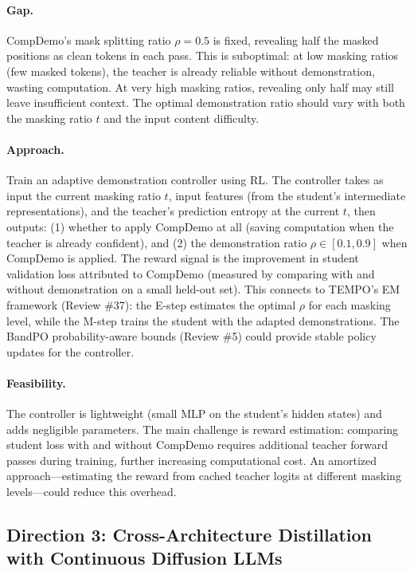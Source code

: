 \documentclass[11pt]{article}
\begin{document}
\paragraph{Gap.}
CompDemo's mask splitting ratio $\rho = 0.5$ is fixed, revealing half the masked positions as clean tokens in each pass. This is suboptimal: at low masking ratios (few masked tokens), the teacher is already reliable without demonstration, wasting computation. At very high masking ratios, revealing only half may still leave insufficient context. The optimal demonstration ratio should vary with both the masking ratio $t$ and the input content difficulty.

\paragraph{Approach.}
Train an adaptive demonstration controller using RL. The controller takes as input the current masking ratio $t$, input features (from the student's intermediate representations), and the teacher's prediction entropy at the current $t$, then outputs: (1) whether to apply CompDemo at all (saving computation when the teacher is already confident), and (2) the demonstration ratio $\rho \in [0.1, 0.9]$ when CompDemo is applied. The reward signal is the improvement in student validation loss attributed to CompDemo (measured by comparing with and without demonstration on a small held-out set). This connects to TEMPO's EM framework (Review \#37): the E-step estimates the optimal $\rho$ for each masking level, while the M-step trains the student with the adapted demonstrations. The BandPO probability-aware bounds (Review \#5) could provide stable policy updates for the controller.

\paragraph{Feasibility.}
The controller is lightweight (small MLP on the student's hidden states) and adds negligible parameters. The main challenge is reward estimation: comparing student loss with and without CompDemo requires additional teacher forward passes during training, further increasing computational cost. An amortized approach---estimating the reward from cached teacher logits at different masking levels---could reduce this overhead.

\subsection{Direction 3: Cross-Architecture Distillation with Continuous Diffusion LLMs}
\end{document}
